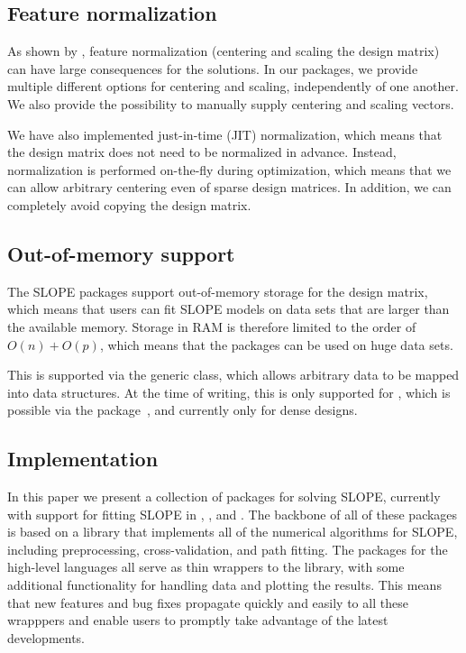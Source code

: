 \documentclass[article]{jss}
\begin{document}
\subsection{Feature normalization}

As shown by \citet{larsson2025}, feature normalization (centering and
scaling the design matrix) can have large consequences for the
solutions. In our packages, we provide multiple different options
for centering and scaling, independently of one another.
We also provide the possibility to manually supply centering
and scaling vectors.

We have also implemented just-in-time (JIT) normalization, which
means that the design matrix does not need to be normalized
in advance. Instead, normalization is performed on-the-fly during
optimization, which means that we can allow arbitrary centering
even of sparse design matrices. In addition, we can completely
avoid copying the design matrix.

\subsection{Out-of-memory support}

The SLOPE packages support out-of-memory storage for the design matrix, which
means that users can fit SLOPE models on data sets that are larger than the
available memory. Storage in RAM is therefore limited to the order of \(O(n) +
O(p)\), which means that the packages can be used on huge data sets.

This is supported via the generic  class, which allows
arbitrary data to be mapped into  data structures. At the
time of writing, this is only supported for ,
which is possible via the  package~\citep{kane2013},
and currently only for dense designs.

\subsection{Implementation}

In this paper we present a collection of packages for solving SLOPE, currently
with support for fitting SLOPE in , , and
. The backbone of all of these packages is based on a
 library that implements all of the numerical algorithms for
SLOPE, including preprocessing, cross-validation, and path fitting. The
packages for the high-level languages all serve as thin wrappers to the
 library, with some additional functionality for handling data
and plotting the results. This means that new features and bug fixes propagate
quickly and easily to all these wrapppers and enable users to promptly take
advantage of the latest developments.
\end{document}
